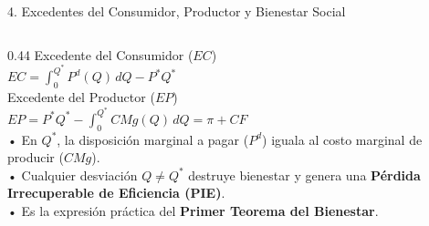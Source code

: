 \documentclass[aspectratio=169, 10pt]{beamer}
\begin{document}
\begin{frame}{4. Excedentes del Consumidor, Productor y Bienestar Social}
\begin{columns}[T]
    \begin{column}{0.44\textwidth}
      {\scriptsize\color{grisTexto}Excedente del Consumidor (\(EC\))}\\[1pt]
      {\large\color{azulPrincipal}\textbf{\(EC = \int_0^{Q^*} P^d(Q)\,dQ - P^* Q^*\)}}\\[6pt]
      {\scriptsize\color{grisTexto}Excedente del Productor (\(EP\))}\\[1pt]
      {\normalsize\color{verdeAcento}\textbf{\(EP = P^* Q^* - \int_0^{Q^*} CMg(Q)\,dQ = \pi + CF\)}}\\[6pt]
      {\scriptsize
        • En \(Q^*\), la disposición marginal a pagar (\(P^d\)) iguala al costo marginal de producir (\(CMg\)).\\
        • Cualquier desviación \(Q \neq Q^*\) destruye bienestar y genera una \textbf{Pérdida Irrecuperable de Eficiencia (PIE)}.\\
        • Es la expresión práctica del \textbf{Primer Teorema del Bienestar}.
      }
    \end{column}
  \end{columns}

\end{frame}
\end{document}

